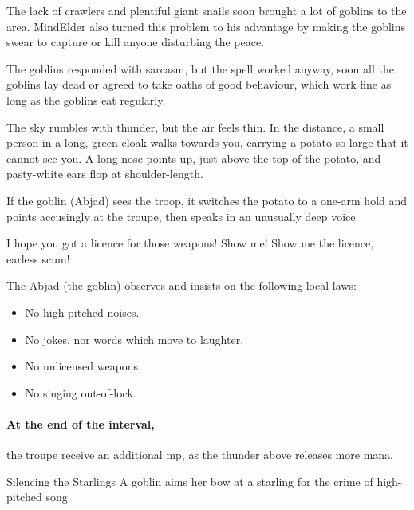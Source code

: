 \begin{exampletext}
  The lack of \glspl{crawler} and plentiful giant snails soon brought a lot of goblins to the area.
  \Gls{MindElder} also turned this problem to his advantage by making the goblins swear to capture or kill anyone disturbing the peace.

  The goblins responded with sarcasm, but the spell worked anyway, soon all the goblins lay dead or agreed to take oaths of good behaviour, which work fine as long as the goblins eat regularly.
\end{exampletext}

\begin{boxtext}
  The sky rumbles with thunder, but the air feels thin.
  In the distance, a small person in a long, green cloak walks towards you, carrying a potato so large that it cannot see you.
  A long nose points up, just above the top of the potato, and pasty-white ears flop at shoulder-length.
\end{boxtext}

If the goblin (Abjad) sees the troop, it switches the potato to a one-arm hold and points accusingly at the troupe, then speaks in an unusually deep voice.

\begin{speechtext}
  I hope you got a licence for those weapons!
  Show me!
  Show me the licence, earless scum!
\end{speechtext}

The Abjad (the goblin) observes and insists on the following local laws:


\begin{itemize}
  \item
  No high-pitched noises.
  \item
  No jokes, nor words which move to laughter.
  \item
  No unlicensed weapons.
  \item
  No singing out-of-lock.
\end{itemize}

\paragraph{At the end of the \gls{interval},}
the troupe receive an additional \gls{mp}, as the thunder above releases more mana.

{Silencing the Starlings}%
{A goblin aims her bow at a starling for the crime of high-pitched song}%

